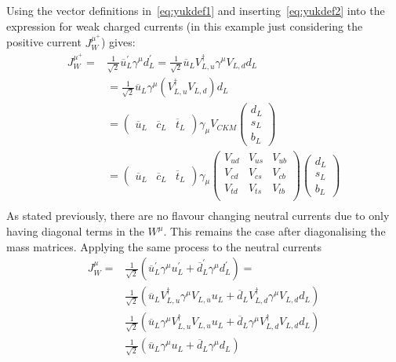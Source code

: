 Using the vector definitions in~\autoref{eq:yukdef1} and inserting~\autoref{eq:yukdef2} into the expression for weak charged currents (in this example just considering the positive current $J^{\mu^{+}}_{W}$) gives:
\begin{equation}
\begin{split}
  J^{\mu^{+}}_{W} =
  & \frac{1}{\sqrt{2}}\overline{u}^{\prime}_{L}\gamma^{\mu}d^{\prime}_{L} = \frac{1}{\sqrt{2}}\overline{u}_{L}V^{\dagger}_{L,u}\gamma^{\mu}V_{L,d}d_{L} \\
  & = \frac{1}{\sqrt{2}}\overline{u}_{L}\gamma^{\mu}(V^{\dagger}_{L,u}V_{L,d})d_{L} \\
  & = \begin{pmatrix}\overline{u}_{L}&\overline{c}_{L}&\overline{t}_{L}\end{pmatrix}\gamma_{\mu}V_{CKM}\begin{pmatrix}d_{L}\\s_{L}\\b_{L}\end{pmatrix} \\
  & = \begin{pmatrix}\overline{u}_{L}&\overline{c}_{L}&\overline{t}_{L}\end{pmatrix}\gamma_{\mu}\begin{pmatrix}V_{ud}&V_{us}&V_{ub}\\V_{cd}&V_{cs}&V_{cb}\\V_{td}&V_{ts}&V_{tb}\\\end{pmatrix} \begin{pmatrix}  d_{L}\\s_{L}\\b_{L}\end{pmatrix} \\
  \end{split}
\end{equation}
As stated previously, there are no flavour changing neutral currents due to only having diagonal terms in the $W^{\mu}$. This remains the case after diagonalising the mass matrices. Applying the same process to the neutral currents
\begin{equation}
  \begin{split}
  J^{\mu}_{W} =
  & \frac{1}{\sqrt{2}}(\overline{u}^{\prime}_{L}\gamma^{\mu}u^{\prime}_{L}  + \overline{d}^{\prime}_{L}\gamma^{\mu}d^{\prime}_{L}) = \\
  & \frac{1}{\sqrt{2}}(\overline{u}_{L}V^{\dagger}_{L,u}\gamma^{\mu}V_{L,u}u_{L}  + \overline{d}_{L}V^{\dagger}_{L,d}\gamma^{\mu}V_{L,d}d_{L}) \\
  & \frac{1}{\sqrt{2}}(\overline{u}_{L}\gamma^{\mu}V^{\dagger}_{L,u}V_{L,u}u_{L}  + \overline{d}_{L}\gamma^{\mu}V^{\dagger}_{L,d}V_{L,d}d_{L}) \\
  & \frac{1}{\sqrt{2}}(\overline{u}_{L}\gamma^{\mu}u_{L}  + \overline{d}_{L}\gamma^{\mu}d_{L}) \\
  \end{split}
\end{equation}
